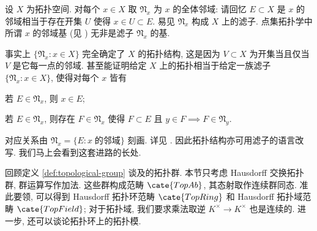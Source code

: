 \begin{example}\label{eg:nbd-filter}
	设 $X$ 为拓扑空间. 对每个 $x \in X$ 取 $\mathfrak{N}_x$ 为 $x$ 的全体邻域: 请回忆 $E \subset X$ 是 $x$ 的邻域相当于存在开集 $U$ 使得 $x \in U \subset E$. 易见 $\mathfrak{N}_x$ 构成 $X$ 上的滤子. 点集拓扑学中所谓 $x$ 的邻域基 (见 \cite[定义 2.6.3]{Xiong}) 无非是滤子 $\mathfrak{N}_x$ 的基.

	事实上 $\{ \mathfrak{N}_x : x \in X \}$ 完全确定了 $X$ 的拓扑结构, 这是因为 $V \subset X$ 为开集当且仅当 $V$ 是它每一点的邻域. 甚至能证明给定 $X$ 上的拓扑相当于给定一族滤子 $\{ \mathfrak{N}_x  : x \in X\}$, 使得对每个 $x$ 皆有
	\begin{compactitem}
		\item 若 $E \in \mathfrak{N}_x$, 则 $x \in E$;
		\item 若 $E \in \mathfrak{N}_x$, 则存在 $F \in \mathfrak{N}_x$ 使得 $F \subset E$ 且 $y \in F \implies F \in \mathfrak{N}_y$.
	\end{compactitem}
	对应关系由 $\mathfrak{N}_x = \{E : x\; \text{的邻域}\}$ 刻画. 详见 \cite[定理 2.2.3]{Xiong}. 因此拓扑结构亦可用滤子的语言改写. 我们马上会看到这套进路的长处.
\end{example}

回顾定义 \ref{def:topological-group} 谈及的拓扑群. 本节只考虑 Hausdorff 交换拓扑群, 群运算写作加法. 这些群构成范畴 $\cate{TopAb}$, 其态射取作连续群同态. 准此要领, 可以得到 Hausdorff 拓扑环范畴 $\cate{TopRing}$ 和 Hausdorff 拓扑域范畴 $\cate{TopField}$; 对于拓扑域, 我们要求乘法取逆 $K^\times \to K^\times$ 也是连续的. 进一步, 还可以谈论拓扑环上的拓扑模.   


